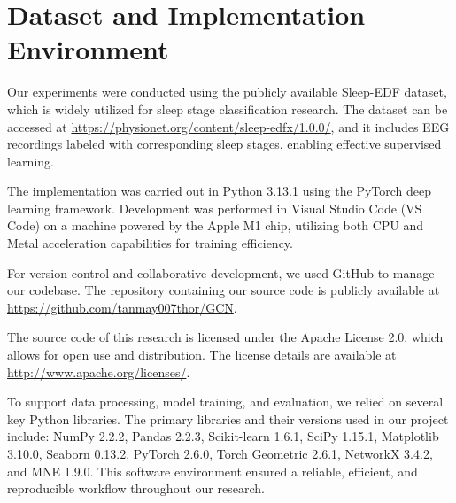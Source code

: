 \section{Dataset and Implementation Environment}

Our experiments were conducted using the publicly available Sleep-EDF dataset, which is widely utilized for sleep stage classification research. The dataset can be accessed at \url{https://physionet.org/content/sleep-edfx/1.0.0/}, and it includes EEG recordings labeled with corresponding sleep stages, enabling effective supervised learning.

The implementation was carried out in Python 3.13.1 using the PyTorch deep learning framework. Development was performed in Visual Studio Code (VS Code) on a machine powered by the Apple M1 chip, utilizing both CPU and Metal acceleration capabilities for training efficiency.

For version control and collaborative development, we used GitHub to manage our codebase. The repository containing our source code is publicly available at \url{https://github.com/tanmay007thor/GCN}.

The source code of this research is licensed under the Apache License 2.0, which allows for open use and distribution. The license details are available at \url{http://www.apache.org/licenses/}.

To support data processing, model training, and evaluation, we relied on several key Python libraries. The primary libraries and their versions used in our project include: NumPy 2.2.2, Pandas 2.2.3, Scikit-learn 1.6.1, SciPy 1.15.1, Matplotlib 3.10.0, Seaborn 0.13.2, PyTorch 2.6.0, Torch Geometric 2.6.1, NetworkX 3.4.2, and MNE 1.9.0. This software environment ensured a reliable, efficient, and reproducible workflow throughout our research.




